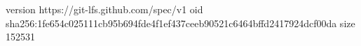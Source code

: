 version https://git-lfs.github.com/spec/v1
oid sha256:1fe654c025111cb95b694fde4f1ef437ceeb90521c6464bffd2417924dcf00da
size 152531
